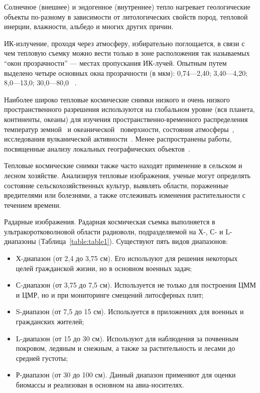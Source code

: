 \documentclass[14pt, russian]{scrartcl}
\begin{document}
Солнечное (внешнее) и эндогенное (внутреннее) тепло нагревает геологические объекты по-разному в зависимости от литологических свойств пород, тепловой инерции, влажности, альбедо и многих других причин.

ИК-излучение, проходя через атмосферу, избирательно поглощается, в связи с чем тепловую съемку можно вести только в зоне расположения так называемых “окон прозрачности” — местах пропускания ИК-лучей. Опытным путем выделено четыре основных окна прозрачности (в мкм): 0,74—2,40; 3,40—4,20; 8,0—13,0; 30,0—80,0 ~\cite{6}.

Наиболее широко тепловые космические снимки низкого и очень низкого пространственного разрешения используются на глобальном уровне (вся планета, континенты, океаны) для изучения пространственно-временного распределения температур земной~\cite{7} и океанической~\cite{8-10} поверхности, состояния атмосферы~\cite{11, 12}, исследования вулканической активности~\cite{13}. Менее распространены работы, посвященные анализу локальных географических объектов~\cite{14}.

Тепловые космические снимки также часто находят применение в сельском и лесном хозяйстве. Анализируя тепловые изображения, ученые могут определять состояние сельскохозяйственных культур, выявлять области, пораженные вредителями или болезнями, а также отслеживать изменения растительности с течением времени.

Радарные изображения. Радарная космическая съемка выполняется в ультракоротковолновой области радиоволн, подразделяемой на Х-, С- и L- диапазоны (Таблица~\ref{table:table1}). Существуют пять видов диапазонов:

\begin{itemize}
    \item Х-диапазон (от 2,4 до 3,75 см). Его используют для решения некоторых целей гражданской жизни, но в основном военных задач;
    \item С-диапазон (от 3,75 до 7,5 см). Используется не только для построения ЦММ и ЦМР, но и при мониторинге смещений литосферных плит;
    \item S-диапазон (от 7,5 до 15 см). Используется в приложениях для военных и гражданских жителей;
    \item L-диапазон (от 15 до 30 см). Используют для наблюдения за почвенным покровом, ледяным и снежным, а также за растительность и лесами до средней густоты;
    \item Р-диапазон (от 30 до 100 см). Данный диапазон применяют для оценки биомассы и реализован в основном на авиа-носителях.
\end{itemize}
\end{document}
